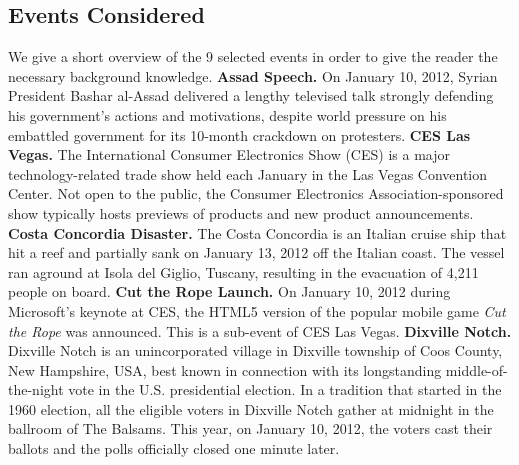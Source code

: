 \documentclass{acm_proc_article-sp}
\newcommand{\inlinelistingsize}{\fontsize{8pt}{11pt}}
\let\oldurl\url
\renewcommand{\url}[1]{\inlinelistingsize\oldurl{#1}}
\begin{document}
\subsection{Events Considered}
We give a short overview of the 9 selected events in order to give the reader the necessary background knowledge.
\newline
\textbf{Assad Speech.} On January 10, 2012, Syrian President Bashar al-Assad delivered a lengthy televised talk strongly defending his government's actions and motivations, despite world pressure on his embattled government for its 10-month crackdown on protesters.
\newline
\textbf{CES Las Vegas.} The International Consumer Electronics Show (CES) is a major technology-related trade show held each January in the Las Vegas Convention Center. Not open to the public, the Consumer Electronics Association-sponsored show typically hosts previews of products and new product announcements.
\newline
\textbf{Costa Concordia Disaster.} The Costa Concordia is an Italian cruise ship that hit a reef and partially sank on January 13, 2012 off the Italian coast.
The vessel ran aground at Isola del Giglio, Tuscany, resulting in the evacuation of 4,211 people on board.
\newline
\textbf{Cut the Rope Launch.} On January 10, 2012 during Microsoft's keynote at CES, the HTML5 version of the popular mobile game \textit{Cut the Rope} was announced. This is a sub-event of CES Las Vegas.
\newline
\textbf{Dixville Notch.} Dixville Notch is an unincorporated village in Dixville township of Coos County, New Hampshire, USA, best known in connection with its longstanding middle-of-the-night vote in the U.S. presidential election. In a tradition that started in the 1960 election, all the eligible voters in Dixville Notch gather at midnight in the ballroom of The Balsams. This year, on January 10, 2012, the voters cast their ballots and the polls officially closed one minute later.
\newline
\end{document}
